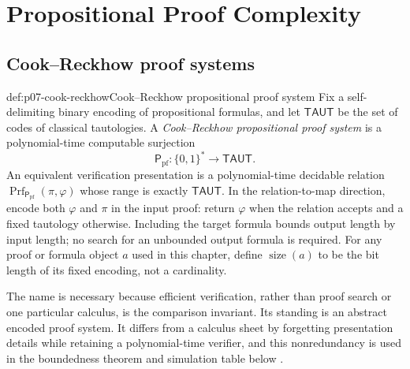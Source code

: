 
\chapter{Propositional Proof Complexity}
\label{sec:p07-proof-complexity}

\section{Cook--Reckhow proof systems}
\label{sec:p07-cook-reckhow}

\begin{hbdefinition}{def:p07-cook-reckhow}{Cook--Reckhow propositional proof system}
Fix a self-delimiting binary encoding of propositional formulas, and let
\(\mathsf{TAUT}\) be the set of codes of classical tautologies.  A
\emph{Cook--Reckhow propositional proof system} is a polynomial-time
computable surjection
\[
  \mathsf P_{\mathrm{pf}}:\{0,1\}^{*}\longrightarrow\mathsf{TAUT}.
\]
An equivalent verification presentation is a polynomial-time decidable relation
\(\operatorname{Prf}_{\mathsf P_{\mathrm{pf}}}(\pi,\varphi)\) whose range is exactly
\(\mathsf{TAUT}\). In the relation-to-map direction, encode both
\(\varphi\) and \(\pi\) in the input proof: return \(\varphi\) when the
relation accepts and a fixed tautology otherwise. Including the target
formula bounds output length by input length; no search for an unbounded
output formula is required. For any proof or formula object \(a\) used in this chapter,
define \(\operatorname{size}(a)\) to be the bit length of its fixed encoding,
not a cardinality.

The name is necessary because efficient verification, rather than proof
search or one particular calculus, is the comparison invariant.  Its standing
is an abstract encoded proof system.  It differs from a calculus sheet by
forgetting presentation details while retaining a polynomial-time verifier,
and this nonredundancy is used in the boundedness theorem and simulation table
below \cite{CookReckhow1979}.
\end{hbdefinition}

